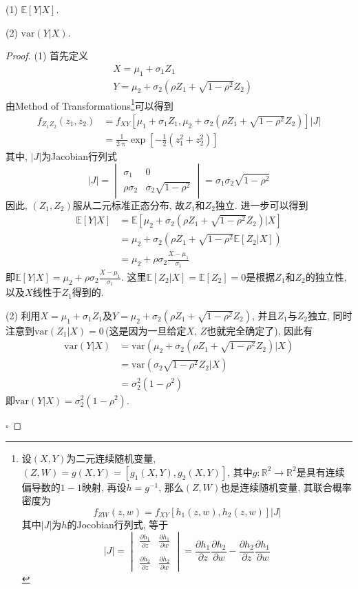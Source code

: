 \documentclass[cn,12pt,math=mtpro2,citestyle=gb7714-2015,bibstyle=gb7714-2015,twocol,mode=simple]{elegantbook}
\newcommand{\R}{\mathbb{R}}
\newcommand{\E}{\mathbb{E}}
\newcommand{\var}{\text{var}}
\begin{document}
(1) $\E[Y|X]$.

(2) $\var(Y|X)$.

\begin{proof}
(1) 首先定义
\begin{align}
&X=\mu_1+\sigma_1Z_1 \nonumber \\
&Y=\mu_2+\sigma_2(\rho Z_1+\sqrt{1-\rho^2}Z_2) \nonumber
\end{align}
由Method of Transformations\footnote{设$(X,Y)$为二元连续随机变量, $(Z,W)=g(X,Y)=[g_1(X,Y), g_2(X,Y)]$, 其中$g: \R^2\to\R^2$是具有连续偏导数的$1-1$映射, 再设$h=g^{-1}$, 那么$(Z,W)$也是连续随机变量, 其联合概率密度为
$$f_{ZW}(z,w)=f_{XY}[h_1(z,w), h_2(z,w)]|J|$$
其中$|J|$为$h$的Jocobian行列式, 等于
$$|J|=\begin{vmatrix}
        \displaystyle\frac{\partial h_1}{\partial z} & \displaystyle\frac{\partial h_1}{\partial w} \\
         & \\
        \displaystyle\frac{\partial h_2}{\partial z}& \displaystyle\frac{\partial h_2}{\partial w}
      \end{vmatrix}=\frac{\partial h_1}{\partial z}\frac{\partial h_2}{\partial w}-\frac{\partial h_2}{\partial z}\frac{\partial h_1}{\partial w}$$}可以得到
\begin{align}
f_{Z_1Z_2}(z_1,z_2)&=f_{XY}[\mu_1+\sigma_1Z_1, \mu_2+\sigma_2(\rho Z_1+\sqrt{1-\rho^2}Z_2)]|J| \nonumber \\
&=\frac{1}{2\uppi}\exp\left[ -\frac{1}{2}(z_1^2+z_2^2)\right] \nonumber
\end{align}
其中, $|J|$为Jacobian行列式
$$|J|=\begin{vmatrix}
  \sigma_1&0 \\
  \rho\sigma_2&\sigma_2\sqrt{1-\rho^2}
\end{vmatrix}=\sigma_1\sigma_2\sqrt{1-\rho^2} $$
因此, $(Z_1, Z_2)$服从二元标准正态分布, 故$Z_1$和$Z_2$独立. 进一步可以得到
\begin{align}
\E[Y|X]&=\E[\mu_2+\sigma_2(\rho Z_1+\sqrt{1-\rho^2}Z_2)|X] \nonumber \\
&=\mu_2+\sigma_2(\rho Z_1+\sqrt{1-\rho^2}\E[Z_2|X]) \nonumber \\
&=\mu_2+\rho\sigma_2\frac{X-\mu_1}{\sigma_1} \nonumber
\end{align}
即$\displaystyle\E[Y|X]=\mu_2+\rho\sigma_2\frac{X-\mu_1}{\sigma_1}$. 这里$\E[Z_2|X]=\E[Z_2]=0$是根据$Z_1$和$Z_2$的独立性, 以及$X$线性于$Z_1$得到的.

(2) 利用$X=\mu_1+\sigma_1Z_1$及$Y=\mu_2+\sigma_2(\rho Z_1+\sqrt{1-\rho^2}Z_2)$, 并且$Z_1$与$Z_2$独立, 同时注意到$\var(Z_1|X)=0\,$(这是因为一旦给定$X$, $Z$也就完全确定了), 因此有
\begin{align}
\var(Y|X)&=\var(\mu_2+\sigma_2(\rho Z_1+\sqrt{1-\rho^2}Z_2)|X) \nonumber \\
&=\var(\sigma_2\sqrt{1-\rho^2}Z_2|X) \nonumber \\
&=\sigma_2^2(1-\rho^2) \nonumber
\end{align}
即$\var(Y|X)=\sigma_2^2(1-\rho^2)$.

$\square$
\end{proof}
\end{document}
